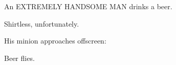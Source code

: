 \documentclass{bubbler}
\begin{document}
\begin{script}
\begin{comment}
BRICK

This is everybody we've ever put away.



STEEL

(starting the engine)

So much for retirement!



They speed off.  To destiny!



CUT TO:


\end{comment}

An EXTREMELY HANDSOME MAN drinks a beer.

    Shirtless, unfortunately.

His minion approaches offscreen:



Beer flies.



\end{script}
\end{document}
